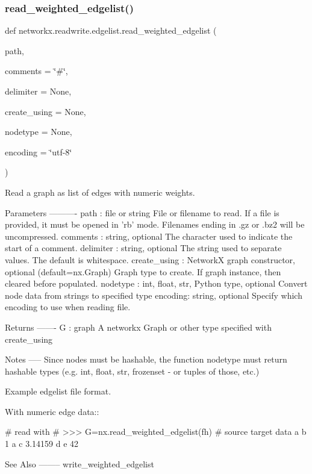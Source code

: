 \subsubsection{\texorpdfstring{read\+\_\+weighted\+\_\+edgelist()}{read\_weighted\_edgelist()}}
{\footnotesize\ttfamily def networkx.\+readwrite.\+edgelist.\+read\+\_\+weighted\+\_\+edgelist (\begin{DoxyParamCaption}\item[{}]{path,  }\item[{}]{comments = {\ttfamily \char`\"{}\#\char`\"{}},  }\item[{}]{delimiter = {\ttfamily None},  }\item[{}]{create\+\_\+using = {\ttfamily None},  }\item[{}]{nodetype = {\ttfamily None},  }\item[{}]{encoding = {\ttfamily \char`\"{}utf-\/8\char`\"{}} }\end{DoxyParamCaption})}

\begin{DoxyVerb}Read a graph as list of edges with numeric weights.

Parameters
----------
path : file or string
   File or filename to read. If a file is provided, it must be
   opened in 'rb' mode.
   Filenames ending in .gz or .bz2 will be uncompressed.
comments : string, optional
   The character used to indicate the start of a comment.
delimiter : string, optional
   The string used to separate values.  The default is whitespace.
create_using : NetworkX graph constructor, optional (default=nx.Graph)
   Graph type to create. If graph instance, then cleared before populated.
nodetype : int, float, str, Python type, optional
   Convert node data from strings to specified type
encoding: string, optional
   Specify which encoding to use when reading file.

Returns
-------
G : graph
   A networkx Graph or other type specified with create_using

Notes
-----
Since nodes must be hashable, the function nodetype must return hashable
types (e.g. int, float, str, frozenset - or tuples of those, etc.)

Example edgelist file format.

With numeric edge data::

 # read with
 # >>> G=nx.read_weighted_edgelist(fh)
 # source target data
 a b 1
 a c 3.14159
 d e 42

See Also
--------
write_weighted_edgelist
\end{DoxyVerb}
 \mbox{\label{namespacenetworkx_1_1readwrite_1_1edgelist_a9def4119e2b369f6a20e221948d97ed7}} 
